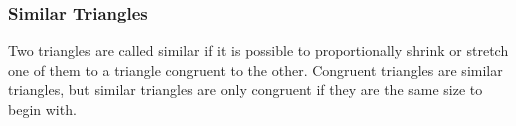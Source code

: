         
        \label{m39368*uid48}
            \subsubsection{ Similar Triangles}
            \nopagebreak
            
          
          \label{m39368*eip-665}Two triangles are called similar if it is possible to proportionally shrink or stretch one of them to a triangle congruent to the other. Congruent triangles are similar triangles, but similar triangles are only congruent if they are the same size to begin with.\par 
    
      
    
    \setlength\mytablespace{4\tabcolsep}
    \addtolength\mytablespace{3\arrayrulewidth}
    \setlength\mytablewidth{\linewidth}
        
    
    \setlength\mytableroom{\mytablewidth}
    \addtolength\mytableroom{-\mytablespace}
    
    \setlength\myfixedwidth{0pt}
    \setlength\mystarwidth{\mytableroom}
        \addtolength\mystarwidth{-\myfixedwidth}
        \divide{}
        
    
            
    
